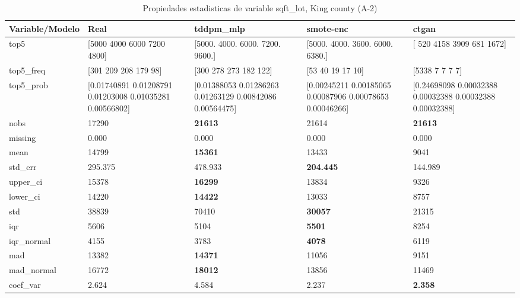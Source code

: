 \begin{table}[H]
\centering
\fontsize{8}{14}\selectfont
\caption{Propiedades  estadisticas de variable sqft\_lot, King county (A-2)}
\label{table-stats-king county-a-2-sqft_lot}
\begin{tabular}{|l|m{10em}|m{10em}|m{10em}|m{10em}|}
\hline
 \rowcolor[gray]{0.8}
Variable/Modelo & Real & tddpm\_mlp & smote-enc & ctgan \\
\hline top5 & [5000 4000 6000 7200 4800] & [5000. 4000. 6000. 7200. 9600.] & [5000. 4000. 3600. 6000. 6380.] & [ 520 4158 3909  681 1672] \\
\hline top5\_freq & [301 209 208 179  98] & [300 278 273 182 122] & [53 40 19 17 10] & [5338    7    7    7    7] \\
\hline top5\_prob & [0.01740891 0.01208791 0.01203008 0.01035281 0.00566802] & [0.01388053 0.01286263 0.01263129 0.00842086 0.00564475] & [0.00245211 0.00185065 0.00087906 0.00078653 0.00046266] & [0.24698098 0.00032388 0.00032388 0.00032388 0.00032388] \\
\hline nobs & 17290 & \bfseries 21613 & \cellcolor[rgb]{0.9, 0.54, 0.52} 21614 & \bfseries 21613 \\
\hline missing & 0.000 & 0.000 & 0.000 & 0.000 \\
\hline mean & 14799 & \bfseries 15361 & 13433 & \cellcolor[rgb]{0.9, 0.54, 0.52} 9041 \\
\hline std\_err & 295.375 & \cellcolor[rgb]{0.9, 0.54, 0.52} 478.933 & \bfseries 204.445 & 144.989 \\
\hline upper\_ci & 15378 & \bfseries 16299 & 13834 & \cellcolor[rgb]{0.9, 0.54, 0.52} 9326 \\
\hline lower\_ci & 14220 & \bfseries 14422 & 13033 & \cellcolor[rgb]{0.9, 0.54, 0.52} 8757 \\
\hline std & 38839 & \cellcolor[rgb]{0.9, 0.54, 0.52} 70410 & \bfseries 30057 & 21315 \\
\hline iqr & 5606 & 5104 & \bfseries 5501 & \cellcolor[rgb]{0.9, 0.54, 0.52} 8254 \\
\hline iqr\_normal & 4155 & 3783 & \bfseries 4078 & \cellcolor[rgb]{0.9, 0.54, 0.52} 6119 \\
\hline mad & 13382 & \bfseries 14371 & 11056 & \cellcolor[rgb]{0.9, 0.54, 0.52} 9151 \\
\hline mad\_normal & 16772 & \bfseries 18012 & 13856 & \cellcolor[rgb]{0.9, 0.54, 0.52} 11469 \\
\hline coef\_var & 2.624 & \cellcolor[rgb]{0.9, 0.54, 0.52} 4.584 & 2.237 & \bfseries 2.358 \\

\end{tabular}
\end{table}
